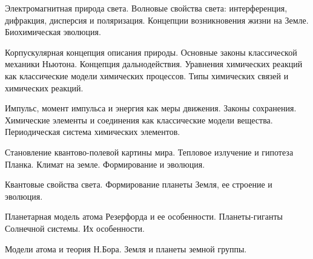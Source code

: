 \documentclass[
	14pt,
	a4paper,
	]
	{scrartcl}
\begin{document}
\shapk
{}
\setcounter{zad}{0}

\vfill
\z Электромагнитная природа света. Волновые свойства света: интерференция, дифракция, дисперсия и поляризация.
 \vfill
\z Концепции возникновения жизни на Земле. Биохимическая эволюция.
 \vfill

\vfill

\newpage


\shapk
{}
\setcounter{zad}{0}

\vfill
\z Корпускулярная концепция описания природы. Основные законы классической механики Ньютона. Концепция дальнодействия.
 \vfill
\z Уравнения химических реакций как классические модели химических процессов. Типы химических связей и химических реакций.
 \vfill

\vfill

\newpage


\shapk
{}
\setcounter{zad}{0}

\vfill
\z Импульс, момент импульса и энергия как меры движения. Законы сохранения.
 \vfill
\z Химические элементы и соединения как классические модели вещества. Периодическая система химических элементов.
 \vfill

\vfill

\newpage


\shapk
{}
\setcounter{zad}{0}

\vfill
\z Становление квантово-полевой картины мира. Тепловое излучение и гипотеза Планка.
 \vfill
\z Климат на земле. Формирование и эволюция.
 \vfill

\vfill

\newpage


\shapk
{}
\setcounter{zad}{0}

\vfill
\z Квантовые свойства света.
 \vfill
\z Формирование планеты Земля, ее строение и эволюция.
 \vfill

\vfill

\newpage


\shapk
{}
\setcounter{zad}{0}

\vfill
\z Планетарная модель атома Резерфорда и ее особенности.
 \vfill
\z Планеты-гиганты Солнечной системы. Их особенности.
 \vfill

\vfill

\newpage


\shapk
{}
\setcounter{zad}{0}

\vfill
\z Модели атома и теория Н.Бора.
 \vfill
\z Земля и планеты земной группы.
 \vfill
\end{document}
